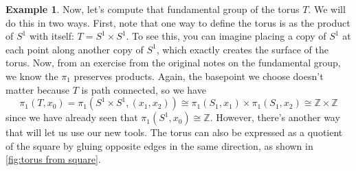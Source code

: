 \documentclass{article}
\theoremstyle{definition}
\newtheorem{exa}[thm]{Example}
\theoremstyle{remark}
\newcommand{\Z}{\mathbb Z}
\numberwithin{figure}{section}
\begin{document}
\begin{exa}\label{exa:compute annulus}
	Now, let's compute that fundamental group of the torus $T$. We will do this in two ways. First, note that one way to define the torus is as the product of $S^1$ with itself: $T = S^1 \times S^1$. To see this, you can imagine placing a copy of $S^1$ at each point along another copy of $S^1$, which exactly creates the surface of the torus. Now, from an exercise from the original notes on the fundamental group, we know the $\pi_1$ preserves products. Again, the basepoint we choose doesn't matter because $T$ is path connected, so we have
	\[
	\pi_1(T, x_0) = \pi_1(S^1 \times S^1, (x_1, x_2)) \cong \pi_1(S_1, x_1) \times \pi_1(S_1, x_2) \cong \Z \times \Z
	\]
	since we have already seen that $\pi_1(S^1, x_0) \cong \Z$. However, there's another way that will let us use our new tools. The torus can also be expressed as a quotient of the square by gluing opposite edges in the same direction, as shown in \cref{fig:torus from square}.
	
	\begin{figure}[h]
		\centering
\end{figure}
\end{exa}
\end{document}
